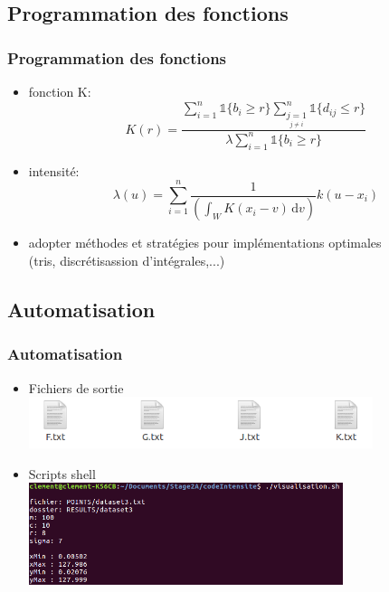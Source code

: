 \documentclass{beamer}
\theoremstyle{remark}
\theoremstyle{plain}
\begin{document}
\subsection{Programmation des fonctions}
\begin{frame}
  \frametitle{Programmation des fonctions}
  \begin{itemize}
        \item{fonction K:
        \begin{equation}
        K(r) = \frac{  \sum_{i=1}^n \mathds{1} \{b_i \geq r \} \sum_{\underset{j \neq i}{j=1}}^n \mathds{1} \{d_{ij} \leq r \}}{\lambda \sum_{i=1}^n \mathds{1} \{b_i \geq r \}}
        \end{equation}
        }
        
        \item{intensité:
        \begin{equation}
            \lambda(u) = \sum_{i=1}^n \frac{1}{ ( \int_W K(x_i-v) \, \mathrm dv )} k(u-x_i)
          \end{equation}
        }
        
        \item{adopter méthodes et stratégies pour implémentations optimales\\(tris, discrétisassion d'intégrales,...)}
  \end{itemize}
\end{frame}


\subsection{Automatisation}
\begin{frame}
  \frametitle{Automatisation}
    \begin{itemize}
        \item{Fichiers de sortie}\\
        \vspace{0.3cm}
        \includegraphics[height=1.5cm]{images/fichierDeSortie.png}
        \vspace{0.5cm}
        \item{Scripts shell}\\
        \vspace{0.3cm}
        \includegraphics[height=3cm]{images/shell.png}
  \end{itemize}
\end{frame}
\end{document}
